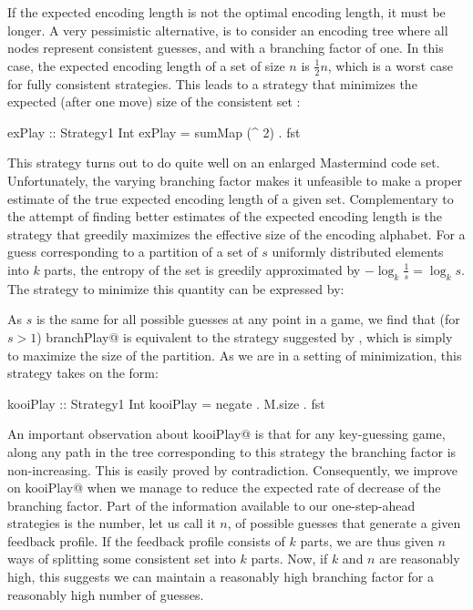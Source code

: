 \documentclass[a4paper]{article}
\makeatletter
\theoremstyle{definition}
\newcommand{\cmd}[1]{\Verb@#1@}
\newcommand{\ignore}[1]{}  %
\newcommand{\strategy}[1]{\marginpar{\bigskip\cmd{#1}}}
\makeatother
\begin{document}
If the expected encoding length is not the optimal encoding length, it must be longer.
A very pessimistic alternative, is to consider an encoding tree where all nodes represent consistent guesses, and with a branching factor of one.
In this case, the expected encoding length of a set of size $n$ is $\frac{1}{2}n$, which is a worst case for fully consistent strategies.
This leads to a strategy that minimizes the expected (after one move) size of the consistent set \citep{Irving1978:taoms}:
\strategy{exPlay}

\begin{code}
exPlay :: Strategy1 Int
exPlay = sumMap (^ 2) . fst
\end{code}

This strategy turns out to do quite well on an enlarged Mastermind code set.
Unfortunately, the varying branching factor makes it unfeasible to make a proper estimate of the true expected encoding length of a given set.
Complementary to the attempt of finding better estimates of the expected encoding length is the strategy that greedily maximizes the effective size of the encoding alphabet.
For a guess corresponding to a partition of a set of $s$ uniformly distributed elements into $k$ parts, the entropy of the set is greedily approximated by $-\log_k \frac{1}{s} = \log_k s$.
The strategy to minimize this quantity can be expressed by:
\strategy{branchPlay}


\ignore{$}
As $s$ is the same for all possible guesses at any point in a game, we find that (for $s > 1$) \cmd{branchPlay} is equivalent to the strategy suggested by \citet{Kooi2005:yams}, which is simply to maximize the size of the partition.
As we are in a setting of minimization, this strategy takes on the form:
\strategy{kooiPlay}

\begin{code}
kooiPlay :: Strategy1 Int
kooiPlay = negate . M.size . fst
\end{code}

An important observation about \cmd{kooiPlay} is that for any key-guessing game, along any path in the tree corresponding to this strategy the branching factor is non-increasing.
This is easily proved by contradiction.
Consequently, we improve on \cmd{kooiPlay} when we manage to reduce the expected rate of decrease of the branching factor.
Part of the information available to our one-step-ahead strategies is the number, let us call it $n$, of possible guesses that generate a given feedback profile.
If the feedback profile consists of $k$ parts, we are thus given $n$ ways of splitting some consistent set into $k$ parts.
Now, if $k$ and $n$ are reasonably high, this suggests we can maintain a reasonably high branching factor for a reasonably high number of guesses.
\end{document}

